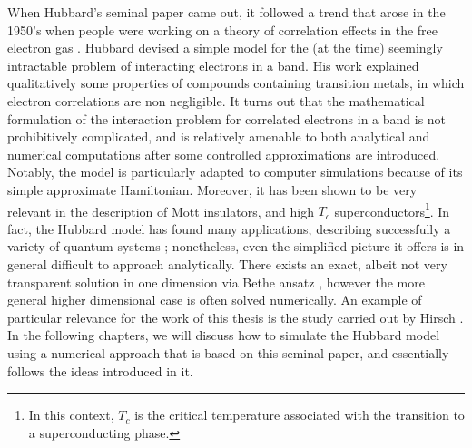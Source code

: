 When Hubbard's seminal paper came out, it followed a trend that arose in the 1950's when people were working on a theory of correlation effects in the free electron gas \cite{bohm_collective_1953, gell-mann_correlation_1957, sawada_correlation_1957, hubbard_description_1958, hubbard_description_1958_2, nozieres_electron_1958}.
Hubbard devised a simple model for the (at the time) seemingly intractable problem of interacting electrons in a band.
His work explained qualitatively some properties of compounds containing transition metals, in which electron correlations are non negligible.
It turns out that the mathematical formulation of the interaction problem for correlated electrons in a band is not prohibitively complicated, and is relatively amenable to both analytical and numerical computations after some controlled approximations are introduced.
Notably, the model is particularly adapted to computer simulations because of its simple approximate Hamiltonian.
Moreover, it has been shown to be very relevant in the description of Mott insulators, and high $T_c$  superconductors\footnote{In this context, $T_c$ is the critical temperature associated with the transition to a superconducting phase.}.
In fact, the Hubbard model has found many applications, describing successfully a variety of quantum systems \cite{editorial_hubbard_2013}; nonetheless, even the simplified picture it offers is in general difficult to approach analytically.
There exists an exact, albeit not very transparent solution in one dimension via Bethe ansatz \cite{lieb_absence_1968}, however the more general higher dimensional case is often solved numerically.
An example of particular relevance for the work of this thesis is the study carried out by Hirsch \cite{hirsch_two-dimensional_1985}.
In the following chapters, we will discuss how to simulate the Hubbard model using a numerical approach that is based on this seminal paper, and essentially follows the ideas introduced in it.

